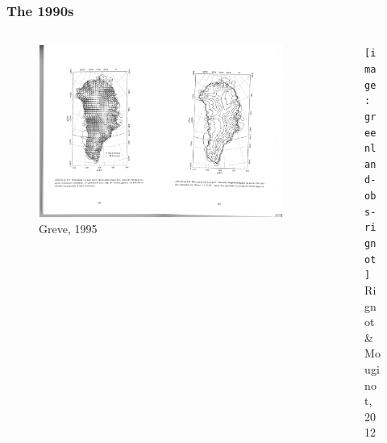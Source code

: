 \documentclass[hide notes,intlimits]{beamer}
\begin{document}
\begin{frame}
  \frametitle{The 1990s}
      \vspace{-2em}
  \begin{columns}[c]
    \begin{column}{.5\linewidth}
    \begin{figure}
      \includegraphics[height=0.75\textheight]{greve_1995_flow}\\
      \tiny{Greve, 1995}
    \end{figure}
    \end{column}
    \begin{column}{.4\linewidth}
      \begin{figure}
      \texttt{[image: greenland-obs-rignot]}\\
      \tiny{Rignot \& Mouginot, 2012}
      \end{figure}
    \end{column}
  \end{columns}
\end{frame}
\end{document}
